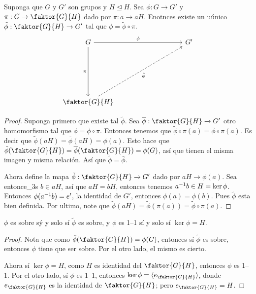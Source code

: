 \begin{theorem}\label{thm_4.12}
    Suponga que $G$ y $G'$ son grupos y  $H \unlhd H$. Sea $\phi:G
    \xrightarrow{} G'$ y $\pi:G \xrightarrow{} \faktor{G}{H}$ dado por $\pi:a
    \xrightarrow{} aH$. Enotnces existe un u\'unico $\tilde{\phi}:\faktor{G}{H}
    \xrightarrow{} G'$ tal que $\phi=\tilde{\phi} \circ \pi$.
    \[\begin{tikzcd}
	G &&&& {G'} \\
	\\
	\\
	\\
	{\faktor{G}{H}}
	\arrow["\phi", from=1-1, to=1-5]
	\arrow["\pi"', from=1-1, to=5-1]
	\arrow["{\tilde{\phi}}"', dashed, from=5-1, to=1-5]
\end{tikzcd}\]
\end{theorem}
\begin{proof}
    Suponga primero que existe tal $\tilde{\phi}$. Sea $\bar{\phi}:\faktor{G}{H}
    \xrightarrow{} G'$ otro homomorfismo tal que $\phi=\bar{\phi} \circ \pi$.
    Entonces tenemos que $\tilde{\phi} \circ \pi(a)=\bar{\phi} \circ \pi(a)$. Es
    decir que $\tilde{\phi}(aH)=\bar{\phi}(aH)=\phi(a)$. Esto hace que
    $\tilde{\phi}(\faktor{G}{H})=\bar{\phi}(\faktor{G}{H})=\phi(G)$, as\'i que
    tienen el misma imagen y misma relaci\'on. As\'i que
    $\tilde{\phi}=\bar{\phi}$.

    Ahora define la mapa $\tilde{\phi}:\faktor{G}{H} \xrightarrow{} G'$ dado por
    $aH \xrightarrow{} \phi(a)$. Sea entonce_3s $b \in aH$, as\'i que  $aH=bH$,
    entonces tenemos  $a^{-1}b \in H=\ker{\phi}$. Entonces $\phi(a^{-1}b)=e'$,
    la identidad de $G'$, entonces  $\phi(a)=\phi(b)$. Pues $\tilde{\phi}$ esta
    bien definida. Por ultimo, note que
    $\tilde{\phi}(aH)=\tilde{\phi}(\pi(a))=\tilde{\phi} \circ \pi(a)$.
\end{proof}
\begin{corollary}
    $\phi$ es sobre s\'y y solo s\'i $\tilde{\phi}$ es sobre, y $\phi$ es  1--1
    s\'i y solo s\'i $\ker{\phi}=H$.
\end{corollary}
\begin{proof}
    Nota que como $\tilde{\phi}(\faktor{G}{H})=\phi(G)$, entonces s\'i
    $\tilde{\phi}$ es sobre, entonces $\phi$ tiene que ser sobre. Por el otro
    lado, el mismo es cierto.

    Ahora s\'i  $\ker{\phi}=H$, como $H$ es identidad del $\faktor{G}{H}$,
    entonces $\phi$ es 1--1. Por el otro lado, s\'i $\phi$ es 1--1, entonces
    $\ker{\phi}=\vbrack{e_{\faktor{G}{H}}}$, donde $e_{\faktor{G}{H}}$ es la
    identidad de $\faktor{G}{H}$; pero $e_{\faktor{G}{H}}=H$.
\end{proof}

